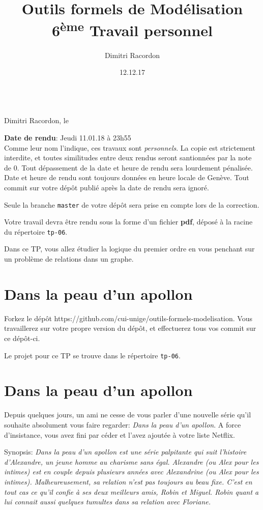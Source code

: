 \documentclass[a4paper, titlepage]{article}
\makeatletter
\numberwithin{figure}{section}
\numberwithin{table}{section}
\newcommand\deadline[1]{\def\@deadline{#1}}
\newcommand\objective[1]{\def\@objective{#1}}
\newcommand{\makecustomtitle}{%
	\begin{center}
		\huge\@title \\
		[1ex]\small Dimitri Racordon, le \@date
	\end{center}
	\begin{framed}\@deadline\end{framed}
	\begin{framed}\@objective\end{framed}
}
\makeatother
\begin{document}
\title{Outils formels de Modélisation \\ 6\textsuperscript{ème} Travail personnel}
\author{Dimitri Racordon}
\date{12.12.17}

\deadline{
\textbf{Date de rendu}: Jeudi 11.01.18 à 23h55 \\

  Comme leur nom l'indique, ces travaux sont \emph{personnels}.
  La copie est strictement interdite, et toutes similitudes entre deux rendus
  seront santionnées par la note de 0.
  Tout dépassement de la date et heure de rendu sera lourdement pénalisée.
  Date et heure de rendu sont toujours données en heure locale de Genève.
  Tout commit sur votre dépôt publié après la date de rendu sera ignoré.

  Seule la branche \texttt{master} de votre dépôt sera prise en compte
  lors de la correction.

  Votre travail devra être rendu sous la forme d'un fichier \textbf{pdf},
  déposé à la racine du répertoire \texttt{tp-06}.
}

\objective{
  Dans ce TP, vous allez étudier la logique du premier ordre
  en vous penchant sur un problème de relations dans un graphe.
}

\makecustomtitle

\section{Dans la peau d’un apollon}

Forkez le dépôt https://github.com/cui-unige/outils-formels-modelisation.
Vous travaillerez sur votre propre version du dépôt,
et effectuerez tous vos commit sur ce dépôt-ci.

Le projet pour ce TP se trouve dans le répertoire \texttt{tp-06}.

\section{Dans la peau d'un apollon}

Depuis quelques jours,
un ami ne cesse de vous parler d’une nouvelle série qu’il souhaite absolument vous faire regarder:
\emph{Dans la peau d’un apollon}.
A force d’insistance, vous avez fini par céder et l’avez ajoutée à votre liste Netflix.

Synopsis:
\emph{
  Dans la peau d’un apollon est une série palpitante qui suit l’histoire d’Alexandre,
  un jeune homme au charisme sans égal.
  Alexandre (ou Alex pour les intimes) est en couple depuis plusieurs années avec Alexandrine
  (ou Alex pour les intimes).
  Malheureusement, sa relation n’est pas toujours au beau fixe.
  C’est en tout cas ce qu’il confie à ses deux meilleurs amis, Robin et Miguel.
  Robin quant a lui connait aussi quelques tumultes dans sa relation avec Floriane.
}
\end{document}
